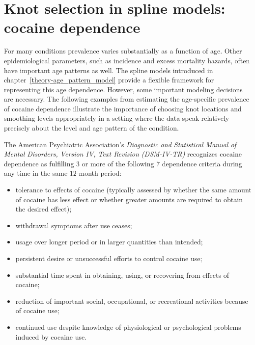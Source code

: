 \chapter{Knot selection in spline models: cocaine dependence}
\label{applications-splines_knot_loc}

For many conditions prevalence varies substantially as a function of
age.  Other epidemiological parameters, such as incidence and
excess mortality hazards, often have important age patterns as well.
The spline models introduced in chapter~\ref{theory-age_pattern_model}
provide a flexible framework for representing this age dependence.  
However, some important modeling decisions are
necessary.  The following examples from estimating the
age-specific prevalence of cocaine dependence illustrate the
importance of choosing knot locations and smoothing levels
appropriately in a setting where the data speak relatively precisely
about the level and age pattern of the condition.

The American Psychiatric Association's \emph{Diagnostic and Statistical 
Manual of Mental Disorders, Version IV,
Text Revision (DSM-IV-TR)} recognizes cocaine dependence as fulfilling $3$ or more of the
following $7$ dependence criteria during any time in the
same $12$-month period: \cite{american_psychiatric_association_diagnostic_2000, wagner_first_2002}
    \begin{itemize} \label{page:app-substance_dependence}
        \item tolerance to effects of cocaine (typically assessed 
            by whether the same amount of cocaine has less effect or 
            whether greater amounts are required to obtain the desired effect);
        \item withdrawal symptoms after use ceases;
        \item usage over longer period or in larger quantities than intended;
        \item persistent desire or unsuccessful efforts to control
          cocaine use;
        \item substantial time spent in obtaining, using, or recovering
          from effects of cocaine;
        \item reduction of important social, occupational, or recreational
          activities because of cocaine use;
        \item continued use despite knowledge of
          physiological or psychological problems induced by cocaine
          use.
    \end{itemize}

